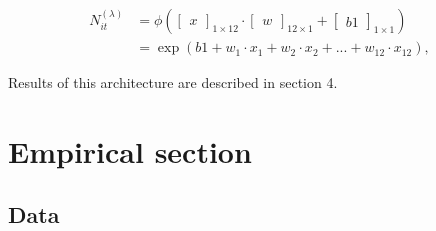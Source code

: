 \begin{align*}
N_{it}^{(\lambda)} &=  
\phi 
(
\begin{bmatrix}
x
\end{bmatrix}_{1 \times 12} \cdot
\begin{bmatrix}
w
\end{bmatrix}_{12 \times 1} +
\begin{bmatrix}
b1
\end{bmatrix}_{1 \times 1}
)\\
&= \exp(b1 + w_1 \cdot x_1 + w_2 \cdot x_2 + ... + w_{12} \cdot x_{12}),
\end{align*}

\noindent Results of this architecture are described in section 4.


\section{Empirical section}
\label{S:3}

\subsection{Data}
\label{sec3-1}


